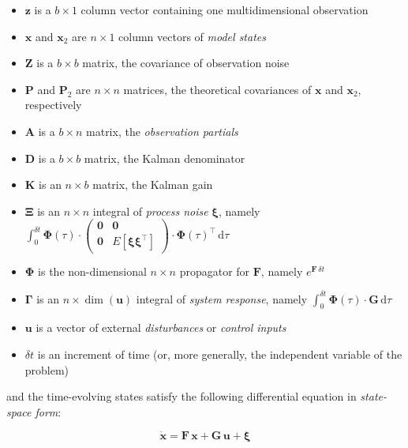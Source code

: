 \documentclass[10pt,oneside,x11names]{article}
\begin{document}
\begin{itemize}
\item \(\mathbold{z}\) is a  \({b}\times{1}\) column vector containing one multidimensional observation
\item \(\mathbold{x}\) and \(\mathbold{x}_{2}\) are \({n}\times{1}\) column vectors of \emph{model states}
\item \(\mathbold{Z}\) is a  \({b}\times{b}\) matrix, the covariance of
observation noise
\item \(\mathbold{P}\) and \(\mathbold{P}_2\) are \({n}\times{n}\) matrices, the theoretical
covariances of \(\mathbold{x}\) and \(\mathbold{x}_2\), respectively
\item \(\mathbold{A}\) is a  \({b}\times{n}\) matrix, the \emph{observation partials}
\item \(\mathbold{D}\) is a  \({b}\times{b}\) matrix, the Kalman denominator
\item \(\mathbold{K}\) is an \({n}\times{b}\) matrix, the Kalman gain
\item \(\mathbold{\Xi}\) is an \(n\times{n}\) integral of \emph{process
noise} \(\mathbold{\xi}\), namely \newline \(\int_{0}^{\delta t}\mathbold{\Phi}(\tau)\cdot{\left(\begin{array}{c|c}\mathbold{0}&\mathbold{0}\\\hline\mathbold{0}&E\left[\mathbold{\xi}\mathbold{\xi}^{\intercal}\right]\end{array}\right)\cdot\mathbold{\Phi}(\tau)^\intercal\,\textrm{d}\tau}\)
\item \(\mathbold{\Phi}\) is the non-dimensional \(n\times{n}\) propagator for \(\mathbold{F}\), namely \(e^{\mathbold{F}\,{\delta t}}\)
\item \(\mathbold{\Gamma}\) is an \(n\times{\dim(\mathbold{u})}\) integral of \emph{system response}, namely \(\int_{0}^{\delta t}{\mathbold{\Phi}(\tau) \cdot \mathbold{G}\,\textrm{d}\tau}\)
\item \(\mathbold{u}\) is a vector of external \emph{disturbances} or \emph{control inputs}
\item \(\delta{t}\) is an increment of time (or, more generally, the independent
variable of the problem)
\end{itemize}

\noindent and the time-evolving states satisfy the following differential
equation in \emph{state-space form}:

\begin{equation}
\label{eqn:state-space-form}
{\dot{\mathbold{x}}}=
\mathbold{F}\,\mathbold{x}+
\mathbold{G}\,\mathbold{u}+
\mathbold{\xi}
\end{equation}
\end{document}

